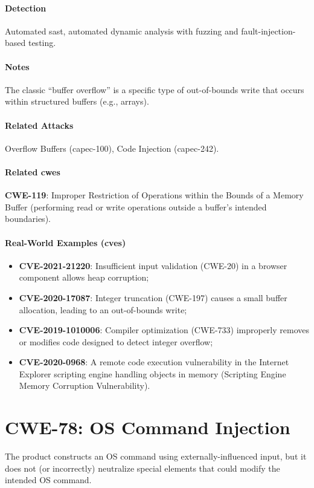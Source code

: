\paragraph{Detection} Automated \gls{sast}, automated dynamic analysis with fuzzing and fault-injection-based testing.

\paragraph{Notes} The classic ``buffer overflow'' is a specific type of out-of-bounds write that occurs within structured buffers (e.g., arrays).

\paragraph{Related Attacks} Overflow Buffers (\gls{capec}-100), Code Injection (\gls{capec}-242).

\paragraph{Related \glspl{cwe}} \textbf{CWE-119}: Improper Restriction of Operations within the Bounds of a Memory Buffer (performing read or write operations outside a buffer's intended boundaries).

\paragraph{Real-World Examples (\glspl{cve})}
\begin{itemize}
    \item \textbf{CVE-2021-21220}: Insufficient input validation (CWE-20) in a browser component allows heap corruption;
    \item \textbf{CVE-2020-17087}: Integer truncation (CWE-197) causes a small buffer allocation, leading to an out-of-bounds write;
    \item \textbf{CVE-2019-1010006}: Compiler optimization (CWE-733) improperly removes or modifies code designed to detect integer overflow;
    \item \textbf{CVE-2020-0968}: A remote code execution vulnerability in the Internet Explorer scripting engine handling objects in memory (Scripting Engine Memory Corruption Vulnerability).
\end{itemize}

\section{CWE-78: OS Command Injection}
The product constructs an OS command using externally-influenced input, but it does not (or incorrectly) neutralize special elements that could modify the intended OS command.

